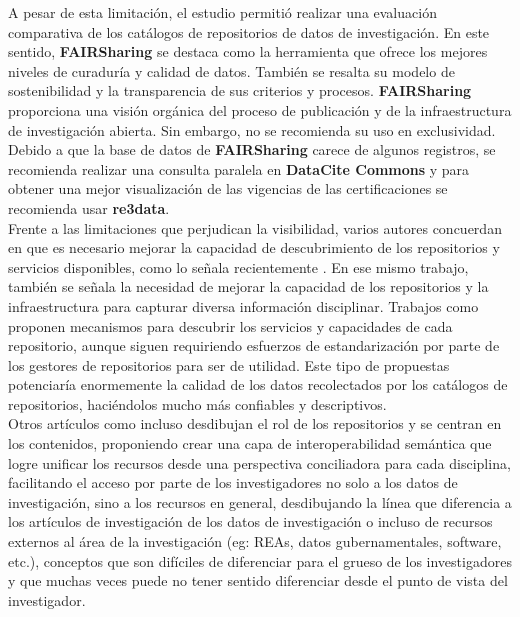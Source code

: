 \documentclass[runningheads]{llncs}
\begin{document}
A pesar de esta limitación, el estudio permitió realizar una evaluación comparativa de los catálogos de repositorios de datos de investigación. En este sentido, \textbf{FAIRSharing} se destaca como la herramienta que ofrece los mejores niveles de curaduría y calidad de datos. También se resalta su modelo de sostenibilidad y la transparencia de sus criterios y procesos. \textbf{FAIRSharing} proporciona una visión orgánica del proceso de publicación y de la infraestructura de investigación abierta. Sin embargo, no se recomienda su uso en exclusividad. Debido a que la base de datos de \textbf{FAIRSharing} carece de algunos registros, se recomienda realizar una consulta paralela en \textbf{DataCite Commons} y para obtener una mejor visualización de las vigencias de las certificaciones se recomienda usar \textbf{re3data}.\\


Frente a las limitaciones que perjudican la visibilidad, varios autores concuerdan en que es necesario mejorar la capacidad de descubrimiento de los repositorios y servicios disponibles, como lo señala recientemente \citet{Huber2024FAIR}. En ese mismo trabajo, también se señala la necesidad de mejorar la capacidad de los repositorios y la infraestructura para capturar diversa información disciplinar. Trabajos como \citet{ulrich_2024_10847707} proponen mecanismos para descubrir los servicios y capacidades de cada repositorio, aunque siguen requiriendo esfuerzos de estandarización por parte de los gestores de repositorios para ser de utilidad. Este tipo de propuestas potenciaría enormemente la calidad de los datos recolectados por los catálogos de repositorios, haciéndolos mucho más confiables y descriptivos.\\

Otros artículos como \citet{Vogt_2025} incluso desdibujan el rol de los repositorios y se centran en los contenidos, proponiendo crear una capa de interoperabilidad semántica que logre unificar los recursos desde una perspectiva conciliadora para cada disciplina, facilitando el  acceso por parte de los investigadores no solo a los datos de investigación, sino a los recursos en general, desdibujando la línea que diferencia a los artículos de investigación de los datos de investigación o incluso de recursos externos al área de la investigación (eg: REAs, datos gubernamentales, software, etc.), conceptos que son difíciles de diferenciar para el grueso de los investigadores y que muchas veces puede no tener sentido diferenciar desde el punto de vista del investigador.\\
\end{document}

